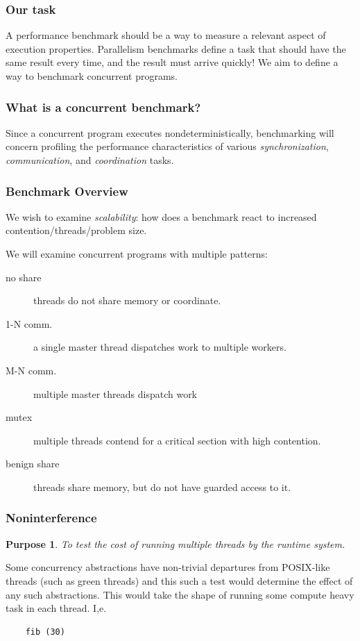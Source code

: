 \documentclass{beamer}
\newtheorem{purpose}{Purpose}
\newcommand{\skipp}[0]{\vskip 0.5cm}
\newcommand{\skippause}[0]{\skipp \pause}
\begin{document}
\begin{frame}
  \frametitle {Our task}
  A performance benchmark should be a way to measure a relevant aspect
  of execution properties.
  \skippause
  Parallelism benchmarks define a task that should have the same result
  every time, and the result must arrive quickly!
  \skippause
  We aim to define a way to benchmark concurrent programs.
\end{frame}

\begin{frame}
  \frametitle{What is a concurrent benchmark?}
  Since a concurrent program executes nondeterministically,
  benchmarking will concern profiling the performance characteristics
  of various \emph{synchronization}, \emph{communication}, and \emph{coordination} 
  tasks.
\end{frame}

\begin{frame}
  \frametitle{Benchmark Overview}
  We wish to examine \emph{scalability}: how does a benchmark react to 
  increased contention/threads/problem size.

  We will examine concurrent programs with multiple patterns:

  \begin{description}
  \item[no share] threads do not share memory or coordinate.
  \item[1-N comm.] a single master thread dispatches work to multiple workers.
  \item[M-N comm.] multiple master threads dispatch work
  \item[mutex] multiple threads contend for a critical section with high contention.
  \item[benign share] threads share memory, but do not have guarded access to it.
  \end{description}
\end{frame}

\begin{frame}[fragile]
  \frametitle{Noninterference}
  \begin{purpose}
    To test the cost of running multiple threads by the runtime system.
  \end{purpose}

  Some concurrency abstractions have non-trivial departures from
  POSIX-like threads (such as green threads) and
  this such a test would determine the effect of any such abstractions.
  \skipp
  This would take the shape of running some compute heavy task
  in each thread. I,e.

  \begin{lstlisting}
    fib (30)
  \end{lstlisting}

\end{frame}
\end{document}
